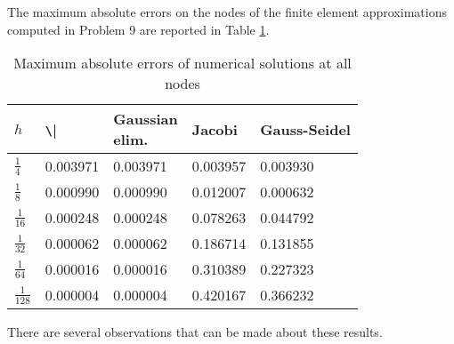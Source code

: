 \documentclass{homework}
\begin{document}
	\question
	The maximum absolute errors on the nodes of the finite element approximations computed in Problem 9 are reported in Table \ref{table:p9}.
	\begin{table}[h]
		\centering
		\begin{tabular}{@{}lllll@{}}
			\toprule
			$h$ & \verb*|\| & \makecell{Gaussian \\ elim.} & Jacobi & Gauss-Seidel \\
			\midrule
			$\frac{1}{4}$ & 0.003971 & 0.003971 & 0.003957 & 0.003930 \\[.4em]
			$\frac{1}{8}$ & 0.000990 & 0.000990 & 0.012007 & 0.000632 \\[.4em]
			$\frac{1}{16}$ & 0.000248 & 0.000248 & 0.078263 & 0.044792 \\[.4em]
			$\frac{1}{32}$ & 0.000062 & 0.000062 & 0.186714 & 0.131855 \\[.4em]
			$\frac{1}{64}$ & 0.000016 & 0.000016 & 0.310389 & 0.227323 \\[.4em]
			$\frac{1}{128}$ & 0.000004 & 0.000004 & 0.420167 & 0.366232 \\[.4em]
			\bottomrule
		\end{tabular}
		\caption{Maximum absolute errors of numerical solutions at all nodes}
		\label{table:p9}
	\end{table}
	There are several observations that can be made about these results.
\end{document}
